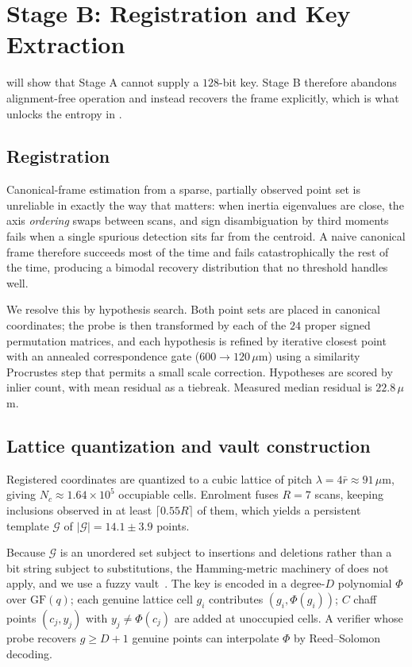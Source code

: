 \documentclass[10pt,twocolumn]{article}
\theoremstyle{remark}
\begin{document}
\section{Stage B: Registration and Key Extraction}
\label{sec:stageB}

 will show that Stage A cannot supply a $128$-bit key. Stage B
therefore abandons alignment-free operation and instead recovers the frame
explicitly, which is what unlocks the entropy in .

\subsection{Registration}

Canonical-frame estimation from a sparse, partially observed point set is
unreliable in exactly the way that matters: when inertia eigenvalues are close,
the axis \emph{ordering} swaps between scans, and sign disambiguation by third
moments fails when a single spurious detection sits far from the centroid. A
naive canonical frame therefore succeeds most of the time and fails
catastrophically the rest of the time, producing a bimodal recovery distribution
that no threshold handles well.

We resolve this by hypothesis search. Both point sets are placed in canonical
coordinates; the probe is then transformed by each of the $24$ proper signed
permutation matrices, and each hypothesis is refined by iterative closest point
with an annealed correspondence gate ($600 \to 120\,\mu$m) using a similarity
Procrustes step that permits a small scale correction. Hypotheses are scored by
inlier count, with mean residual as a tiebreak. Measured median residual is
$22.8\,\mu$m.

\subsection{Lattice quantization and vault construction}

Registered coordinates are quantized to a cubic lattice of pitch
$\lambda = 4\bar{r} \approx 91\,\mu$m, giving $N_c \approx 1.64\times10^5$
occupiable cells. Enrolment fuses $R=7$ scans, keeping inclusions observed in at
least $\lceil 0.55R \rceil$ of them, which yields a persistent template
$\mathcal{G}$ of $|\mathcal{G}| = 14.1 \pm 3.9$ points.

Because $\mathcal{G}$ is an unordered set subject to insertions and deletions
rather than a bit string subject to substitutions, the Hamming-metric machinery
of  does not apply, and we use a fuzzy vault~\cite{juels2006}.
The key is encoded in a degree-$D$ polynomial $\Phi$ over $\mathrm{GF}(q)$;
each genuine lattice cell $g_i$ contributes $(g_i, \Phi(g_i))$; $C$ chaff points
$(c_j, y_j)$ with $y_j \neq \Phi(c_j)$ are added at unoccupied cells. A verifier
whose probe recovers $g \geq D+1$ genuine points can interpolate $\Phi$ by
Reed--Solomon decoding.
\end{document}
